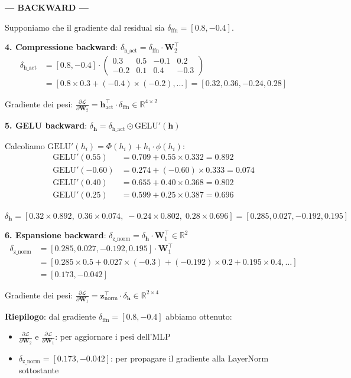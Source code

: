 \documentclass[12pt,a4paper]{article}
\begin{document}
\begin{examplebox}
\textbf{--- BACKWARD ---}

Supponiamo che il gradiente dal residual sia $\delta_{\text{ffn}} = [0.8, -0.4]$.

\textbf{4. Compressione backward}: $\delta_{\text{h\_act}} = \delta_{\text{ffn}} \cdot \mathbf{W}_2^\top$
\begin{align*}
\delta_{\text{h\_act}} &= [0.8, -0.4] \cdot \begin{pmatrix} 0.3 & 0.5 & -0.1 & 0.2 \\ -0.2 & 0.1 & 0.4 & -0.3 \end{pmatrix} \\
&= [0.8 \times 0.3 + (-0.4) \times (-0.2), \ldots] = [0.32, 0.36, -0.24, 0.28]
\end{align*}

Gradiente dei pesi: $\frac{\partial \mathcal{L}}{\partial \mathbf{W}_2} = \mathbf{h}_{\text{act}}^\top \cdot \delta_{\text{ffn}} \in \mathbb{R}^{4 \times 2}$

\textbf{5. GELU backward}: $\delta_{\mathbf{h}} = \delta_{\text{h\_act}} \odot \text{GELU}'(\mathbf{h})$

Calcoliamo $\text{GELU}'(h_i) = \Phi(h_i) + h_i \cdot \phi(h_i)$:
\begin{align*}
\text{GELU}'(0.55) &= 0.709 + 0.55 \times 0.332 = 0.892 \\
\text{GELU}'(-0.60) &= 0.274 + (-0.60) \times 0.333 = 0.074 \\
\text{GELU}'(0.40) &= 0.655 + 0.40 \times 0.368 = 0.802 \\
\text{GELU}'(0.25) &= 0.599 + 0.25 \times 0.387 = 0.696
\end{align*}

$\delta_{\mathbf{h}} = [0.32 \times 0.892,\; 0.36 \times 0.074,\; -0.24 \times 0.802,\; 0.28 \times 0.696] = [0.285, 0.027, -0.192, 0.195]$

\textbf{6. Espansione backward}: $\delta_{\text{z\_norm}} = \delta_{\mathbf{h}} \cdot \mathbf{W}_1^\top \in \mathbb{R}^{2}$
\begin{align*}
\delta_{\text{z\_norm}} &= [0.285, 0.027, -0.192, 0.195] \cdot \mathbf{W}_1^\top \\
&= [0.285 \times 0.5 + 0.027 \times (-0.3) + (-0.192) \times 0.2 + 0.195 \times 0.4, \ldots] \\
&= [0.173, -0.042]
\end{align*}

Gradiente dei pesi: $\frac{\partial \mathcal{L}}{\partial \mathbf{W}_1} = \mathbf{z}_{\text{norm}}^\top \cdot \delta_{\mathbf{h}} \in \mathbb{R}^{2 \times 4}$

\textbf{Riepilogo}: dal gradiente $\delta_{\text{ffn}} = [0.8, -0.4]$ abbiamo ottenuto:
\begin{itemize}
\item $\frac{\partial \mathcal{L}}{\partial \mathbf{W}_2}$ e $\frac{\partial \mathcal{L}}{\partial \mathbf{W}_1}$: per aggiornare i pesi dell'MLP
\item $\delta_{\text{z\_norm}} = [0.173, -0.042]$: per propagare il gradiente alla LayerNorm sottostante
\end{itemize}
\end{examplebox}
\end{document}
